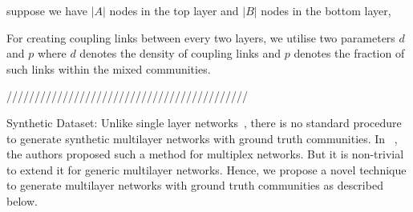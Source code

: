 
\iffalse

suppose we have $|A|$ nodes in the top layer and $|B|$ nodes in the bottom layer,


For creating coupling links between every two layers,
 we utilise two parameters $d$ and $p$ where $d$ denotes the density of coupling links and $p$ denotes the fraction of such links
 within the mixed
 communities.

///////////////////////////////////////////
 \item Synthetic Dataset: Unlike single layer networks~\cite{lancichinetti2008benchmark}, there is no standard procedure to
 generate synthetic multilayer networks with
 ground truth communities. In ~\cite{Arenas}, the authors proposed such a method for multiplex networks. But it is non-trivial to extend
 it for generic multilayer networks. Hence, we propose a novel technique to generate multilayer networks with ground truth
 communities as described below.

